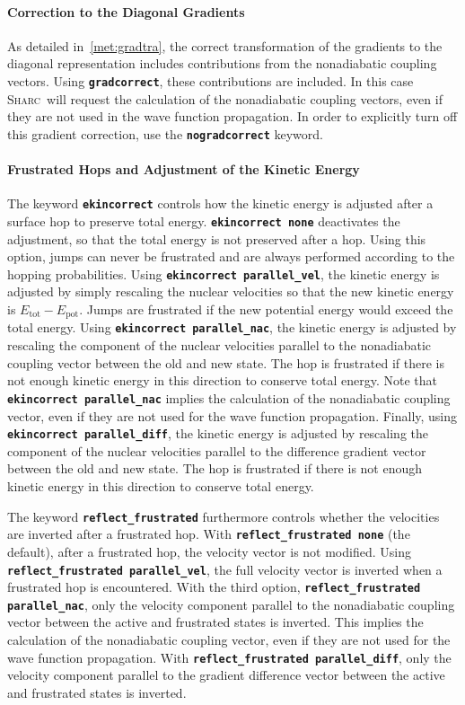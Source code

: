 \documentclass[a4paper,10pt,DIV=15,openany]{scrbook}
\newcommand{\sharc}{\textsc{Sharc}}
\newcommand{\ttt}[1]{\textbf{\texttt{#1}}}
\begin{document}
\paragraph{Correction to the Diagonal Gradients}

As detailed in~\ref{met:gradtra}, the correct transformation of the gradients to the diagonal representation includes contributions from the nonadiabatic coupling vectors. Using \ttt{gradcorrect}, these contributions are included. In this case \sharc\ will request the calculation of the nonadiabatic coupling vectors, even if they are not used in the wave function propagation. In order to explicitly turn off this gradient correction, use the \ttt{nogradcorrect} keyword.

\paragraph{Frustrated Hops and Adjustment of the Kinetic Energy}

The keyword \ttt{ekincorrect} controls how the kinetic energy is adjusted after a surface hop to preserve total energy. \ttt{ekincorrect none} deactivates the adjustment, so that the total energy is not preserved after a hop. Using this option, jumps can never be frustrated and are always performed according to the hopping probabilities. 
Using \ttt{ekincorrect parallel\_vel}, the kinetic energy is adjusted by simply rescaling the nuclear velocities so that the new kinetic energy is $E_{\text{tot}}-E_{\text{pot}}$. Jumps are frustrated if the new potential energy would exceed the total energy.
Using \ttt{ekincorrect parallel\_nac}, the kinetic energy is adjusted by rescaling the component of the nuclear velocities parallel to the nonadiabatic coupling vector between the old and new state. The hop is frustrated if there is not enough kinetic energy in this direction to conserve total energy. Note that \ttt{ekincorrect parallel\_nac} implies the calculation of the nonadiabatic coupling vector, even if they are not used for the wave function propagation.
Finally, using \ttt{ekincorrect parallel\_diff}, the kinetic energy is adjusted by rescaling the component of the nuclear velocities parallel to the difference gradient vector between the old and new state. The hop is frustrated if there is not enough kinetic energy in this direction to conserve total energy. 

The keyword \ttt{reflect\_frustrated} furthermore controls whether the velocities are inverted after a frustrated hop.
With \ttt{reflect\_frustrated none} (the default), after a frustrated hop, the velocity vector is not modified.
Using \ttt{reflect\_frustrated parallel\_vel}, the full velocity vector is inverted when a frustrated hop is encountered.
With the third option, \ttt{reflect\_frustrated parallel\_nac}, only the velocity component parallel to the nonadiabatic coupling vector between the active and frustrated states is inverted. This implies the calculation of the nonadiabatic coupling vector, even if they are not used for the wave function propagation.
With \ttt{reflect\_frustrated parallel\_diff}, only the velocity component parallel to the gradient difference vector between the active and frustrated states is inverted.
\end{document}
